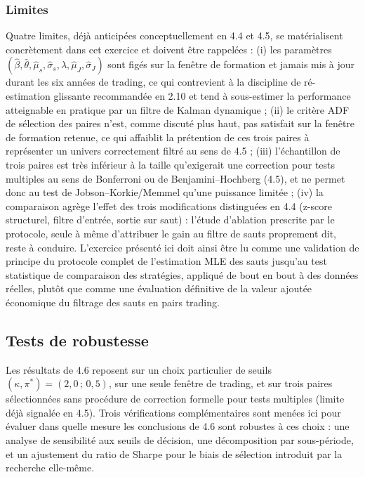 \documentclass{article}
\begin{document}
\subsubsection*{Limites}
Quatre limites, déjà anticipées conceptuellement en 4.4 et 4.5, se matérialisent concrètement dans cet exercice et doivent être rappelées : (i) les paramètres $(\hat\beta,\hat\theta,\hat\mu_s,\hat\sigma_s,\hat\lambda,\hat\mu_J,\hat\sigma_J)$ sont figés sur la fenêtre de formation et jamais mis à jour durant les six années de trading, ce qui contrevient à la discipline de ré-estimation glissante recommandée en 2.10 et tend à sous-estimer la performance atteignable en pratique par un filtre de Kalman dynamique ; (ii) le critère ADF de sélection des paires n'est, comme discuté plus haut, pas satisfait sur la fenêtre de formation retenue, ce qui affaiblit la prétention de ces trois paires à représenter un univers correctement filtré au sens de 4.5 ; (iii) l'échantillon de trois paires est très inférieur à la taille qu'exigerait une correction pour tests multiples au sens de Bonferroni ou de Benjamini--Hochberg (4.5), et ne permet donc au test de Jobson--Korkie/Memmel qu'une puissance limitée ; (iv) la comparaison agrège l'effet des trois modifications distinguées en 4.4 (z-score structurel, filtre d'entrée, sortie sur saut) : l'étude d'ablation prescrite par le protocole, seule à même d'attribuer le gain au filtre de sauts proprement dit, reste à conduire. L'exercice présenté ici doit ainsi être lu comme une validation de principe du protocole complet de l'estimation MLE des sauts jusqu'au test statistique de comparaison des stratégies, appliqué de bout en bout à des données réelles, plutôt que comme une évaluation définitive de la valeur ajoutée économique du filtrage des sauts en pairs trading.

\subsection{Tests de robustesse}
Les résultats de 4.6 reposent sur un choix particulier de seuils $(\kappa,\pi^\ast)=(2{,}0\,;\,0{,}5)$, sur une seule fenêtre de trading, et sur trois paires sélectionnées sans procédure de correction formelle pour tests multiples (limite déjà signalée en 4.5). Trois vérifications complémentaires sont menées ici pour évaluer dans quelle mesure les conclusions de 4.6 sont robustes à ces choix : une analyse de sensibilité aux seuils de décision, une décomposition par sous-période, et un ajustement du ratio de Sharpe pour le biais de sélection introduit par la recherche elle-même.
\end{document}
